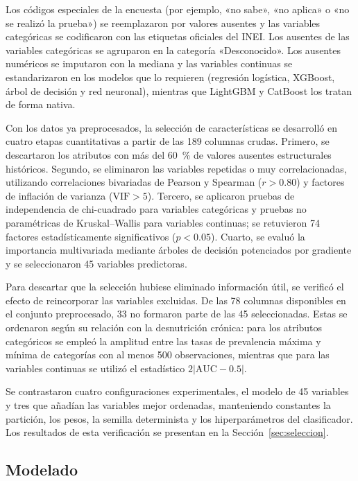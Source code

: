 \documentclass[final,5p,times,twocolumn,number,lefttitle]{elsarticle}
\begin{document}
Los códigos especiales de la encuesta (por ejemplo, «no sabe», «no aplica» o «no se realizó la prueba») se reemplazaron por valores ausentes y las variables categóricas se codificaron con las etiquetas oficiales del INEI. Los ausentes de las variables categóricas se agruparon en la categoría «Desconocido». Los ausentes numéricos se imputaron con la mediana y las variables continuas se estandarizaron en los modelos que lo requieren (regresión logística, XGBoost, árbol de decisión y red neuronal), mientras que LightGBM y CatBoost los tratan de forma nativa.

Con los datos ya preprocesados, la selección de características se desarrolló en cuatro etapas cuantitativas a partir de las 189 columnas crudas. Primero, se descartaron los atributos con más del 60~\% de valores ausentes estructurales históricos. Segundo, se eliminaron las variables repetidas o muy correlacionadas, utilizando correlaciones bivariadas de Pearson y Spearman ($r>0.80$) y factores de inflación de varianza ($\mathrm{VIF}>5$). Tercero, se aplicaron pruebas de independencia de chi-cuadrado para variables categóricas y pruebas no paramétricas de Kruskal--Wallis para variables continuas; se retuvieron 74 factores estadísticamente significativos ($p<0.05$). Cuarto, se evaluó la importancia multivariada mediante árboles de decisión potenciados por gradiente y se seleccionaron 45 variables predictoras.

Para descartar que la selección hubiese eliminado información útil, se verificó el efecto de reincorporar las variables excluidas. De las 78 columnas disponibles en el conjunto preprocesado, 33 no formaron parte de las 45 seleccionadas. Estas se ordenaron según su relación con la desnutrición crónica: para los atributos categóricos se empleó la amplitud entre las tasas de prevalencia máxima y mínima de categorías con al menos 500 observaciones, mientras que para las variables continuas se utilizó el estadístico $2\lvert\mathrm{AUC}-0.5\rvert$.

Se contrastaron cuatro configuraciones experimentales, el modelo de 45 variables y tres que añadían las variables mejor ordenadas, manteniendo constantes la partición, los pesos, la semilla determinista y los hiperparámetros del clasificador. Los resultados de esta verificación se presentan en la Sección~\ref{sec:seleccion}.

\subsection{Modelado}
\end{document}
